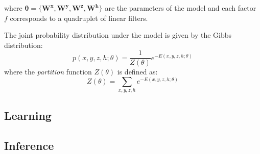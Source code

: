 \documentclass{article}
\begin{document}
where $\boldsymbol{\theta} = \{\boldsymbol{W^x}, \boldsymbol{W^y}, \boldsymbol{W^z}, \boldsymbol{W^h}\}$ are the parameters of the model and each factor $f$ corresponds to a quadruplet of linear filters.

The joint probability distribution under the model is given by the Gibbs distribution:
\begin{equation}
p(x,y,z,h;\theta) = \frac{1}{Z(\theta)}e^{-E(x,y,z,h;\theta)} 
\end{equation}
where the \textit{partition} function $Z(\theta)$ is defined as:
\begin{equation}
Z(\theta) = \sum_{x,y,z,h}{e^{-E(x,y,z,h;\theta)}}
\end{equation}


\subsection{Learning}


\subsection{Inference}
\end{document}
